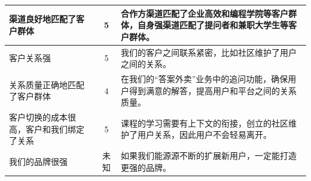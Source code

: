 \documentclass[a4paper]{ctexart}
\begin{document}
\begin{table}[h]
  \centering
\begin{tabular}{|p{3.5cm}|c|p{10cm}|}
  \hline
  渠道良好地匹配了客户群体 & 5 & 合作方渠道匹配了企业高效和编程学院等客户群体，自身强渠道匹配了提问者和兼职大学生等客户群体。\\
  \hline
  客户关系强 & 5 & 我们的客户之间联系紧密，比如社区维护了用户之间的关系。\\
  \hline
  关系质量正确地匹配了客户群体 & 4 & 在我们的“答案外卖”业务中的追问功能，确保用户得到满意的解答，提高用户和平台之间的关系质量。\\
  \hline
  客户切换的成本很高，客户和我们绑定了关系 & 5 & 课程的学习需要有上下文的衔接，创立的社区维护了用户关系，因此用户不会轻易离开。\\
  \hline
  我们的品牌很强 & 未知 & 如果我们能源源不断的扩展新用户，一定能打造更强的品牌。\\
  \hline
\end{tabular}
\end{table}









\end{document}
